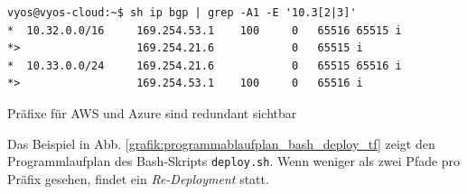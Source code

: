 \begin{listing}[h]
\begin{verbatim}
vyos@vyos-cloud:~$ sh ip bgp | grep -A1 -E '10.3[2|3]'
*  10.32.0.0/16     169.254.53.1    100     0   65516 65515 i
*>                  169.254.21.6            0   65515 i
*  10.33.0.0/24     169.254.21.6            0   65515 65516 i
*>                  169.254.53.1    100     0   65516 i

\end{verbatim}
\caption{Präfixe für AWS und Azure sind redundant sichtbar}
\label{bgp-paths-vyos}
\end{listing}
\newpage
Das Beispiel in Abb. \ref{grafik:programmablaufplan_bash_deploy_tf} zeigt den Programmlaufplan des Bash-Skripts \texttt{deploy.sh}. Wenn weniger als zwei Pfade pro Präfix gesehen, findet ein \textit{Re-\gls{Deployment}} statt.

